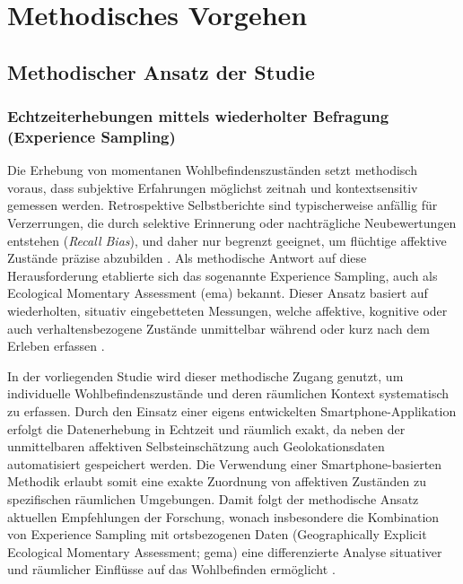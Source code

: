 
\section{Methodisches Vorgehen} \label{sec:methodik}

\subsection{Methodischer Ansatz der Studie}

\subsubsection{Echtzeiterhebungen mittels wiederholter Befragung (Experience Sampling)}

Die Erhebung von momentanen Wohlbefindenszuständen setzt methodisch voraus, dass subjektive Erfahrungen möglichst zeitnah und kontextsensitiv gemessen werden. Retrospektive Selbstberichte sind typischerweise anfällig für Verzerrungen, die durch selektive Erinnerung oder nachträgliche Neubewertungen entstehen (\textit{Recall Bias}), und daher nur begrenzt geeignet, um flüchtige affektive Zustände präzise abzubilden \parencite{kahnemanDevelopmentsMeasurementSubjective2006}. Als methodische Antwort auf diese Herausforderung etablierte sich das sogenannte Experience Sampling, auch als Ecological Momentary Assessment (\acrshort{ema}) bekannt. Dieser Ansatz basiert auf wiederholten, situativ eingebetteten Messungen, welche affektive, kognitive oder auch verhaltensbezogene Zustände unmittelbar während oder kurz nach dem Erleben erfassen \parencite{birenboimInfluenceUrbanEnvironments2018, kirchnerSpatiotemporalDeterminantsMental2016}.

In der vorliegenden Studie wird dieser methodische Zugang genutzt, um individuelle Wohlbefindenszustände und deren räumlichen Kontext systematisch zu erfassen. Durch den Einsatz einer eigens entwickelten Smartphone-Applikation erfolgt die Datenerhebung in Echtzeit und räumlich exakt, da neben der unmittelbaren affektiven Selbsteinschätzung auch Geolokationsdaten automatisiert gespeichert werden. Die Verwendung einer Smartphone-basierten Methodik erlaubt somit eine exakte Zuordnung von affektiven Zuständen zu spezifischen räumlichen Umgebungen. Damit folgt der methodische Ansatz aktuellen Empfehlungen der Forschung, wonach insbesondere die Kombination von Experience Sampling mit ortsbezogenen Daten (Geographically Explicit Ecological Momentary Assessment; \acrshort{gema}) eine differenzierte Analyse situativer und räumlicher Einflüsse auf das Wohlbefinden ermöglicht \parencite{mascherekMeadowsAsphaltRoad2025, kirchnerSpatiotemporalDeterminantsMental2016}.


